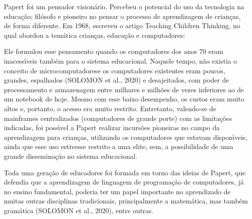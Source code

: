 \documentclass[
12pt,		%
openright,	%
twoside,  %
a4paper,			%
chapter=TITLE,		%
english,			%
french,				%
spanish,			%
brazil				%
]{USPSC-classe/USPSC}
\begin{document}
Papert foi um pensador vision\'ario. Percebeu o potencial do uso da tecnologia na educa\c{c}\~ao; fil\'osofo e pioneiro no pensar o processo de aprendizagem de crian\c{c}as, de forma diferente. Em 1968, escreveu o artigo \textquotedbl Teaching Children Thinking\textquotedbl , no qual abordou a tem\'atica crian\c{c}as, educa\c{c}\~ao e computadores:










\noindent\begin{center}\mbox{\centering{}}\end{center}


Ele formulou esse pensamento quando os computadores dos anos 70 eram inacess\'{\i}veis tamb\'em para o sistema educacional. Naquele tempo, n\~ao existia o conceito de \textquotedbl microcomputadores\textquotedbl  e os computadores existentes eram poucos, grandes, espalhados  (SOLOMON et al., 2020) e desajeitados, com poder de processamento e armazenagem entre milhares e milh\~oes de vezes inferiores ao de um notebook de hoje. Mesmo com esse baixo desempenho, os custos eram muito altos e, portanto, o acesso era muito restrito. Entretanto, valendo-se de mainframes centralizados (computadores de grande porte) com as limita\c{c}\~oes indicadas, foi poss\'{\i}vel a Papert realizar incurs\~oes pioneiras no campo da aprendizagem para crian\c{c}as, utilizando os computadores que estavam dispon\'{\i}veis, ainda que esse uso estivesse restrito a uma elite, sem, a possibilidade de uma grande dissemina\c{c}\~ao no sistema educacional.









Toda uma gera\c{c}\~ao de educadores foi formada em torno das ideias de Papert, que defendia que a aprendizagem de linguagem de programa\c{c}\~ao de computadores, j\'a no ensino fundamental, poderia ter um papel importante no aprendizado de muitas outras disciplinas tradicionais, principalmente a matem\'atica, mas tamb\'em gram\'atica (SOLOMON et al., 2020), entre outras.
\end{document}
